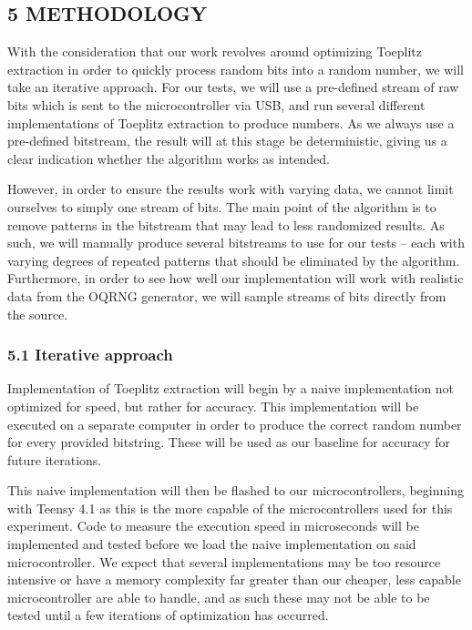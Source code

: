 \documentclass{sigchi}
\begin{document}
\subsection{5 METHODOLOGY}\label{methodology}

With the consideration that our work revolves around optimizing Toeplitz extraction in order to quickly process random bits into a random number, we will take an iterative approach. For our tests, we will use a pre-defined stream of raw bits which is sent to the microcontroller via USB, and run several different implementations of Toeplitz extraction to produce numbers. As we always use a pre-defined bitstream, the result will at this stage be deterministic, giving us a clear indication whether the algorithm works as intended.

However, in order to ensure the results work with varying data, we cannot limit ourselves to simply one stream of bits. The main point of the algorithm is to remove patterns in the bitstream that may lead to less randomized results. As such, we will manually produce several bitstreams to use for our tests -- each with varying degrees of repeated patterns that should be eliminated by the algorithm. Furthermore, in order to see how well our implementation will work with realistic data from the OQRNG generator, we will sample streams of bits directly from the source.

\subsubsection{5.1 Iterative approach}\label{iterative-approach}

Implementation of Toeplitz extraction will begin by a naive implementation not optimized for speed, but rather for accuracy. This implementation will be executed on a separate computer in order to produce the correct random number for every provided bitstring. These will be used as our baseline for accuracy for future iterations.

This naive implementation will then be flashed to our microcontrollers, beginning with Teensy 4.1 as this is the more capable of the microcontrollers used for this experiment. Code to measure the execution speed in microseconds will be implemented and tested before we load the naive implementation on said microcontroller. We expect that several implementations may be too resource intensive or have a memory complexity far greater than our cheaper, less capable microcontroller are able to handle, and as such these may not be able to be tested until a few iterations of optimization has occurred.
\end{document}
